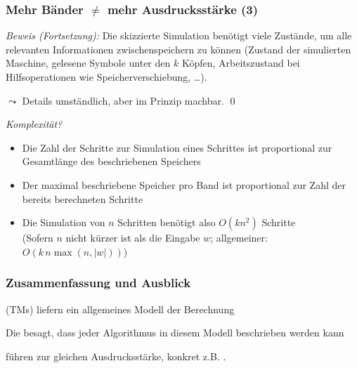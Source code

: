 \documentclass[onlymath]{beamer}
\begin{document}
\begin{frame}[t]\frametitle{Mehr Bänder $\neq$ mehr Ausdrucksstärke (3)}


\emph{Beweis (Fortsetzung):} Die skizzierte Simulation benötigt viele Zustände, um alle relevanten Informationen zwischenspeichern zu können (Zustand der simulierten Maschine, gelesene Symbole unter den $k$ Köpfen, Arbeitszustand bei Hilfsoperationen wie Speicherverschiebung, \ldots).\medskip

$\leadsto$ Details umständlich, aber im Prinzip machbar. \qed
\pause\bigskip

\emph{Komplexität?}
\begin{itemize}
\item Die Zahl der Schritte zur Simulation eines Schrittes ist proportional zur Gesamtlänge des beschriebenen Speichers 
\item Der maximal beschriebene Speicher pro Band ist proportional zur Zahl der bereits berechneten Schritte
\item Die Simulation von $n$ Schritten benötigt also $O(k n^2)$ Schritte\\[-1ex]{\tiny (Sofern $n$ nicht kürzer ist als die Eingabe $w$; allgemeiner: $O(k\, n \max(n,|w|))$)}
\end{itemize}
\end{frame}



\begin{frame}\frametitle{Zusammenfassung und Ausblick}

 (TMs) liefern ein allgemeines Modell der Berechnung
\bigskip

Die  besagt, dass jeder Algorithmus in diesem Modell beschrieben werden kann
\bigskip

 führen zur gleichen Ausdrucksstärke, konkret z.B. .
\bigskip


\end{frame}
\end{document}
